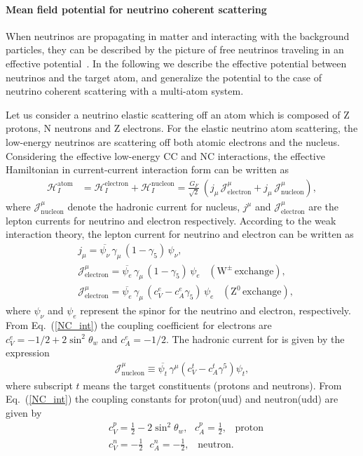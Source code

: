 \paragraph{Mean field potential for neutrino coherent scattering}
When neutrinos are propagating in matter and interacting with the background particles, they can be described by the picture of free neutrinos traveling in an effective potential~\cite{Wolfenstein:1977ue}. In the following we describe the effective potential between neutrinos and the target atom, and generalize the potential to the case of neutrino coherent scattering with a multi-atom system.


Let us consider a neutrino elastic scattering off an atom which is composed of Z protons, N neutrons and Z electrons. For the elastic neutrino atom scattering, the low-energy neutrinos are scattering off both atomic electrons and the nucleus. Considering the effective low-energy CC and NC interactions, the effective Hamiltonian in current-current interaction form can be written as 
\begin{align}
\label{H_atom}
\mathcal{H}_I^{\mathrm{atom}}&=\mathcal{H}^\mathrm{electron}_I+\mathcal{H}^\mathrm{nucleon}_I=\frac{G_F}{\sqrt{2}}\,\left(j_\mu\,\mathcal{J}^\mu_{\mathrm{electron}}+j_\mu\,\mathcal{J}^\mu_\mathrm{nucleon}\right),
\end{align}
where $\mathcal{J}^\mu_{\mathrm{nucleon}}$ denote the hadronic current for nucleus, $j^\mu$ and $\mathcal{J}^\mu_{\mathrm{electron}}$ are the lepton currents for neutrino and electron respectively. According to the weak interaction theory, the lepton current for neutrino and  electron can be written as
\begin{align}
&j_\mu=\overline{\psi_{\nu}}\,\gamma_\mu\,\left(1-\gamma_5\right)\,\psi_\nu,\\
\label{Current_e}
&\mathcal{J}^\mu_{\mathrm{electron}}=\overline{\psi_{e}}\,\gamma_\mu\,\left(1-\gamma_5\right)\,\psi_e\,\,\,\,\,(\mathrm{W^\pm\,exchange}),\\
&\mathcal{J}^\mu_{\mathrm{electron}}=\overline{\psi_{e}}\,\gamma_\mu\,\left(c_V^e-c_A^e\gamma_5\right)\,\psi_e\,\,\,\,\,(\mathrm{Z^0\,exchange}),
\end{align}
where  $\psi_\nu$ and $\psi_e$ represent the spinor for the neutrino and electron, respectively. From Eq.~(\ref{NC_int}) the coupling coefficient for electrons are $c^e_V=-1/2+2\sin^2\theta_w$ and $c^e_A=-1/2$. The hadronic current for is given by the expression~\cite{Giunti:2007ry}
\begin{align}
\label{Current_h}
\mathcal{J}^\mu_\mathrm{nucleon}\equiv\overline{\psi_t}\,\gamma^\mu\left(c^t_V-c^t_A\gamma^5\right)\psi_t,
\end{align}
where subscript $t$ means the target constituents (protons and neutrons). From Eq.~(\ref{NC_int}) the coupling constants for proton(uud) and neutron(udd) are given by
\begin{align}
&c^p_V=\frac{1}{2}-2\sin^2\theta_w,\,\,\,\,c^p_A=\frac{1}{2},\,\,\,\,\,\mathrm{proton}\\
&c^n_V=-\frac{1}{2}\,\,\,\,c^n_A=-\frac{1}{2},\,\,\,\,\,\mathrm{neutron}.
\end{align}


